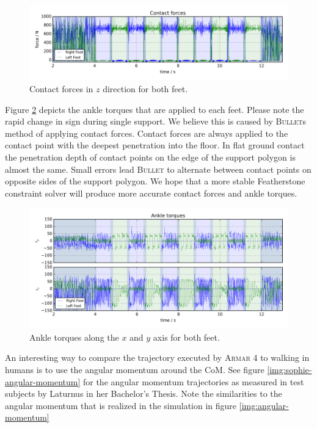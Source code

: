 \documentclass[english,ngerman]{KITreprt}
\newcommand{\name}[1]{\textsc{#1}}
\begin{document}
\begin{figure}[hbt]
\vspace*{-1em}
\includegraphics[width=\textwidth,resolution=300]{images/contact_forces.png}
\caption{Contact forces in $z$ direction for both feet.}
\label{img:contact_forces}
\end{figure}

Figure \ref{img:ankle-torques} depicts the ankle torques that are
applied to each feet. Please note the rapid change in sign during single
support. We believe this is caused by \name{Bullet}s method of applying
contact forces. Contact forces are always applied to the contact point
with the deepest penetration into the floor. In flat ground contact the
penetration depth of contact points on the edge of the support polygon
is almost the same. Small errors lead \name{Bullet} to alternate between
contact points on opposite sides of the support polygon. We hope that a
more stable Featherstone constraint solver will produce more accurate
contact forces and ankle torques.

\begin{figure}[H]
\vspace*{-1em}
\includegraphics[width=\textwidth,resolution=300]{images/ankle_torques.png}
\caption{Ankle torques along the $x$ and $y$ axis for both feet.}
\label{img:ankle-torques}
\end{figure}

An interesting way to compare the trajectory executed by \name{Armar 4}
to walking in humans is to use the angular momentum around the CoM. See
figure \ref{img:sophie-angular-momentum} for the angular momentum
trajectories as measured in test subjects by Laturnus
\cite{laturnus2014} in her Bachelor's Thesis. Note the similarities to
the angular momentum that is realized in the simulation in figure
\ref{img:angular-momentum}
\end{document}
